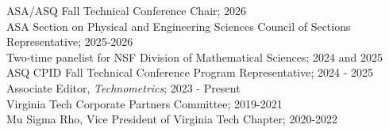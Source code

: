 \documentclass[margin,line,11pt]{res}
\begin{document}
\begin{resume}
ASA/ASQ Fall Technical Conference Chair; 2026 \\
ASA Section on Physical and Engineering Sciences Council of Sections Representative; 2025-2026 \\
Two-time panelist for NSF Division of Mathematical Sciences; 2024 and 2025 \\
ASQ CPID Fall Technical Conference Program Representative; 2024 - 2025 \\
Associate Editor, {\it Technometrics}; 2023 - Present \\
Virginia Tech Corporate Partners Committee; 2019-2021 \\
Mu Sigma Rho, Vice President of Virginia Tech Chapter; 2020-2022



\end{resume}
\end{document}
